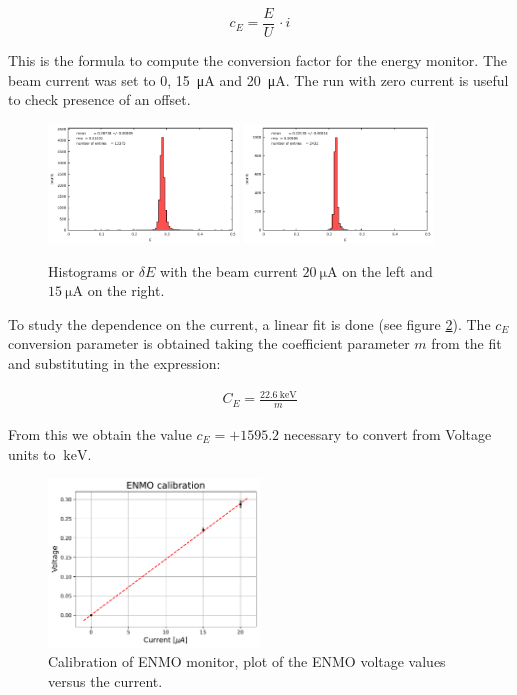 \begin{equation}
c_{E} = \frac{E}{U} \, \cdot i
\end{equation}  

This is the formula to compute the conversion factor for the energy monitor. The beam current was set to 0, \SI{15}{\micro \ampere} and \SI{20}{\micro \ampere}. The run with zero current is useful to check presence of an offset.

\begin{figure}[!ht]
\centering
\includegraphics[width = 0.45\textwidth]{Analysis/ENMOvoltage20.pdf}
\includegraphics[width = 0.45\textwidth]{Analysis/ENMOvoltage15.pdf} 
\caption{Histograms or $\delta E$ with the beam current $\SI{20}{\micro \ampere}$ on the left and $\SI{15}{\micro \ampere}$ on the right.}
\label{fig:EnergyCalibration}
\end{figure}


To study the dependence on the current, a linear fit is done (see figure \ref{fig:EnmoFit}). The $c_{E}$ conversion parameter is obtained taking the coefficient parameter $m$ from the fit and substituting in the expression:

\begin{align*}
C_{E} =  \frac{\SI{22.6}{\kilo \electronvolt}}{m}
\end{align*}

From this we obtain the value $c_{E} = +1595.2$ necessary to convert from Voltage units to $\SI{}{\kilo \electronvolt}$.

\begin{figure}[!ht]
\centering
\includegraphics[width = 0.5\textwidth]{Analysis/Calibrations/E18_Calibration.pdf}
\caption{Calibration of ENMO monitor, plot of the ENMO voltage values versus the current.}
\label{fig:EnmoFit}
\end{figure}

